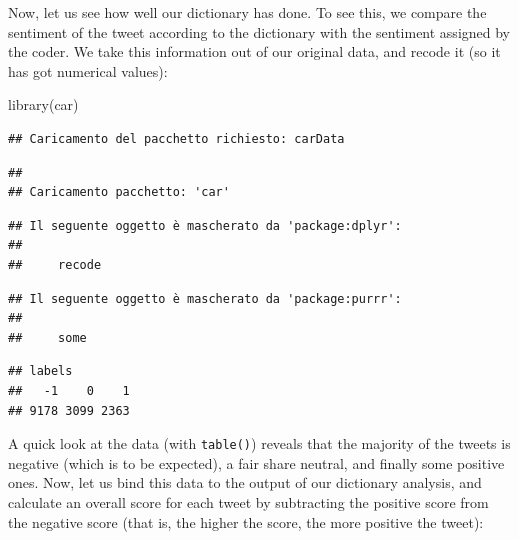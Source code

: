 \documentclass[
]{book}
\newenvironment{Shaded}{\begin{snugshade}}{\end{snugshade}}
\newcommand{\FunctionTok}[1]{\textcolor[rgb]{0.00,0.00,0.00}{#1}}
\newcommand{\NormalTok}[1]{#1}
\newcommand{\OtherTok}[1]{\textcolor[rgb]{0.56,0.35,0.01}{#1}}
\newcommand{\SpecialCharTok}[1]{\textcolor[rgb]{0.00,0.00,0.00}{#1}}
\newcommand{\StringTok}[1]{\textcolor[rgb]{0.31,0.60,0.02}{#1}}
\begin{document}
Now, let us see how well our dictionary has done. To see this, we compare the sentiment of the tweet according to the dictionary with the sentiment assigned by the coder. We take this information out of our original data, and recode it (so it has got numerical values):

\begin{Shaded}
\begin{Highlighting}[]
\FunctionTok{library}\NormalTok{(car)}
\end{Highlighting}
\end{Shaded}

\begin{verbatim}
## Caricamento del pacchetto richiesto: carData
\end{verbatim}

\begin{verbatim}
## 
## Caricamento pacchetto: 'car'
\end{verbatim}

\begin{verbatim}
## Il seguente oggetto è mascherato da 'package:dplyr':
## 
##     recode
\end{verbatim}

\begin{verbatim}
## Il seguente oggetto è mascherato da 'package:purrr':
## 
##     some
\end{verbatim}

\begin{Shaded}
\end{Shaded}

\begin{verbatim}
## labels
##   -1    0    1 
## 9178 3099 2363
\end{verbatim}

A quick look at the data (with \texttt{table()}) reveals that the majority of the tweets is negative (which is to be expected), a fair share neutral, and finally some positive ones. Now, let us bind this data to the output of our dictionary analysis, and calculate an overall score for each tweet by subtracting the positive score from the negative score (that is, the higher the score, the more positive the tweet):
\end{document}
